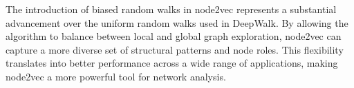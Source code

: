 The introduction of biased random walks in node2vec represents a substantial advancement over the uniform random walks used in DeepWalk. By allowing the algorithm to balance between local and global graph exploration, node2vec can capture a more diverse set of structural patterns and node roles. This flexibility translates into better performance across a wide range of applications, making node2vec a more powerful tool for network analysis.